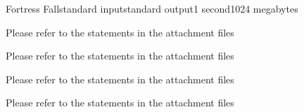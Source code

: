\begin{problem}{Fortress Fall}{standard input}{standard output}{1 second}{1024 megabytes}

Please refer to the statements in the attachment files

\InputFile
Please refer to the statements in the attachment files

\OutputFile
Please refer to the statements in the attachment files

\Example

\begin{example}
%
\end{example}

\Note
Please refer to the statements in the attachment files

\end{problem}

